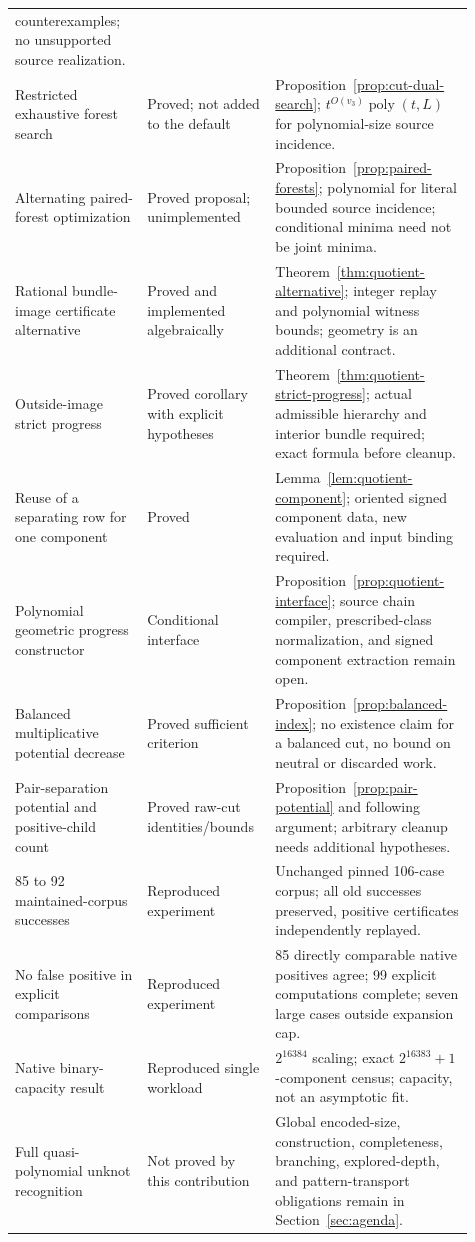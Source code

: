\begin{longtable}{P{0.27\linewidth}P{0.24\linewidth}P{0.40\linewidth}}
counterexamples; no unsupported source realization.\\
Restricted exhaustive forest search & Proved; not added to the default &
Proposition~\ref{prop:cut-dual-search}; $t^{O(v_3)}\operatorname{poly}(t,L)$
for polynomial-size source incidence.\\
Alternating paired-forest optimization & Proved proposal; unimplemented &
Proposition~\ref{prop:paired-forests}; polynomial for literal bounded source
incidence; conditional minima need not be joint minima.\\
Rational bundle-image certificate alternative & Proved and implemented
algebraically & Theorem~\ref{thm:quotient-alternative}; integer replay and
polynomial witness bounds; geometry is an additional contract.\\
Outside-image strict progress & Proved corollary with explicit hypotheses &
Theorem~\ref{thm:quotient-strict-progress}; actual admissible hierarchy and
interior bundle required; exact formula before cleanup.\\
Reuse of a separating row for one component & Proved &
Lemma~\ref{lem:quotient-component}; oriented signed component data,
new evaluation and input binding required.\\
Polynomial geometric progress constructor & Conditional interface &
Proposition~\ref{prop:quotient-interface}; source chain compiler,
prescribed-class normalization, and signed component extraction remain open.\\
Balanced multiplicative potential decrease & Proved sufficient criterion &
Proposition~\ref{prop:balanced-index}; no existence claim for a balanced
cut, no bound on neutral or discarded work.\\
Pair-separation potential and positive-child count & Proved raw-cut
identities/bounds & Proposition~\ref{prop:pair-potential} and following
argument; arbitrary cleanup needs additional hypotheses.\\
85 to 92 maintained-corpus successes & Reproduced experiment &
Unchanged pinned 106-case corpus; all old successes preserved, positive
certificates independently replayed.\\
No false positive in explicit comparisons & Reproduced experiment &
85 directly comparable native positives agree; 99 explicit computations
complete; seven large cases outside expansion cap.\\
Native binary-capacity result & Reproduced single workload &
$2^{16384}$ scaling; exact $2^{16383}+1$-component census; capacity, not an
asymptotic fit.\\
Full quasi-polynomial unknot recognition & Not proved by this contribution &
Global encoded-size, construction, completeness, branching, explored-depth,
and pattern-transport obligations remain in Section~\ref{sec:agenda}.\\
\bottomrule
\end{longtable}
